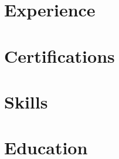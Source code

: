 \documentclass[10pt, letterpaper]{article}
\begin{document}






\section*{Experience}


\section*{Certifications}


\section*{Skills}


\section*{Education}

\end{document}
